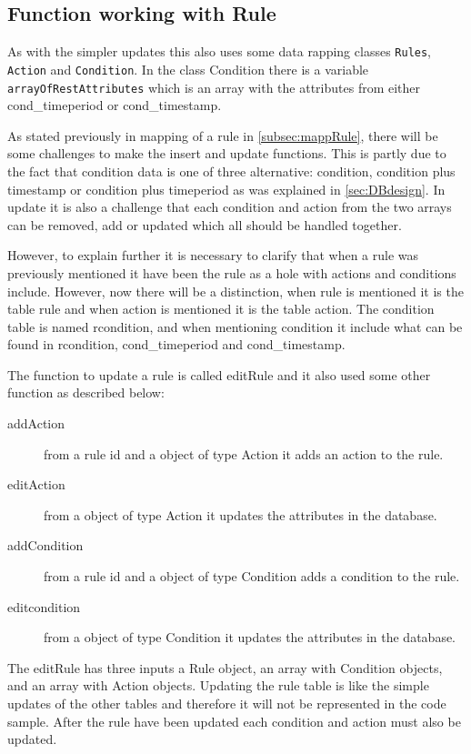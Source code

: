 \subsection{Function working with Rule}
\label{subsec:dbRule}
As with the simpler updates this also uses some data rapping classes \texttt{Rules}, \texttt{Action} and \texttt{Condition}. In the class Condition there is a variable \texttt{arrayOfRestAttributes} which is an array with the attributes from either cond\_timeperiod or cond\_timestamp.

As stated previously in mapping of a rule in \vref{subsec:mappRule}, there will be some challenges to make the insert and update functions. This is partly due to the fact that condition data is one of three alternative: condition, condition plus timestamp or condition plus timeperiod as was explained in \vref{sec:DBdesign}. In update it is also a challenge that each condition and action from the two arrays can be removed, add or updated which all should be handled together. 

However, to explain further it is necessary to clarify that when a rule was previously mentioned it have been the rule as a hole with actions and conditions include. However, now there will be a distinction, when rule is mentioned it is the table rule and when action is mentioned it is the table action. The condition table is named rcondition, and when mentioning condition it include what can be found in rcondition, cond\_timeperiod and cond\_timestamp. 

The function to update a rule is called editRule and it also used some other function as described below:

\begin{description}
	\item[addAction] from a rule id and a object of type Action it adds an action to the rule.
	\item[editAction] from a object of type Action it updates the attributes in the database.   
	\item[addCondition] from a rule id and a object of type Condition adds a condition to the rule.
	\item[editcondition] from a object of type Condition it updates the attributes in the database.   
\end{description}

The editRule has three inputs a Rule object, an array with Condition objects, and an array with Action objects. Updating the rule table is like the simple updates of the other tables and therefore it will not be represented in the code sample. After the rule have been updated each condition and action must also be updated. 

